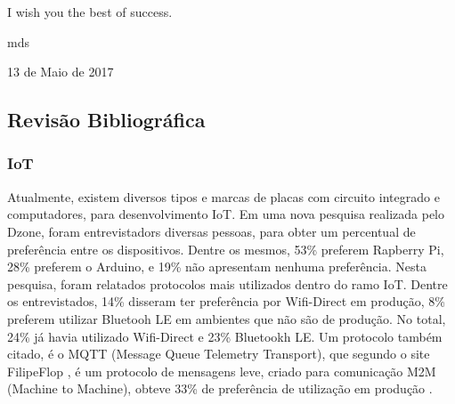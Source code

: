 \documentclass[journal]{IEEEtran}
\begin{document}


I wish you the best of success.

\hfill mds
 
\hfill 13 de Maio de 2017

\subsection{Revisão Bibliográfica}
\subsubsection{IoT}

Atualmente, existem diversos tipos e marcas de placas com circuito integrado e computadores, para desenvolvimento IoT. Em uma nova pesquisa realizada pelo Dzone, foram entrevistadors diversas pessoas, para obter um percentual de preferência entre os dispositivos. Dentre os mesmos, 53\% preferem Rapberry Pi, 28\% preferem o Arduino, e 19\% não apresentam nenhuma preferência. Nesta pesquisa, foram relatados protocolos mais utilizados dentro do ramo IoT. Dentre os entrevistados, 14\% disseram ter preferência por Wifi-Direct em produção, 8\% preferem utilizar Bluetooh LE em ambientes que não são de produção. No total, 24\% já havia utilizado Wifi-Direct e 23\% Bluetookh LE. Um protocolo também citado, é o MQTT (Message Queue Telemetry Transport), que segundo o site FilipeFlop \cite{filipeflopnodemcu}, é um protocolo de mensagens leve, criado para comunicação M2M (Machine to Machine),  obteve 33\% de preferência de utilização em produção \cite[p.~4]{dzoneiotvolume4}.
\end{document}
